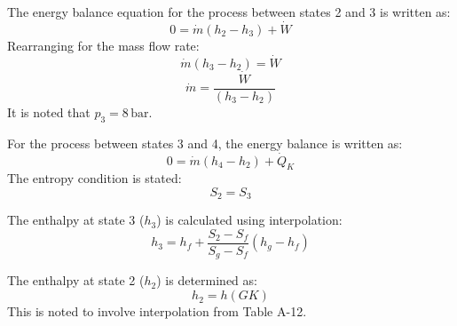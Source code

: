 The energy balance equation for the process between states 2 and 3 is written as:  
\[
0 = \dot{m} (h_2 - h_3) + \dot{W}
\]  
Rearranging for the mass flow rate:  
\[
\dot{m} (h_3 - h_2) = \dot{W}
\]  
\[
\dot{m} = \frac{\dot{W}}{(h_3 - h_2)}
\]  
It is noted that \(p_3 = 8 \, \text{bar}\).  

For the process between states 3 and 4, the energy balance is written as:  
\[
0 = \dot{m} (h_4 - h_2) + \dot{Q}_K
\]  
The entropy condition is stated:  
\[
S_2 = S_3
\]  

The enthalpy at state 3 (\(h_3\)) is calculated using interpolation:  
\[
h_3 = h_f + \frac{S_2 - S_f}{S_g - S_f} (h_g - h_f)
\]  

The enthalpy at state 2 (\(h_2\)) is determined as:  
\[
h_2 = h(GK)
\]  
This is noted to involve interpolation from Table A-12.